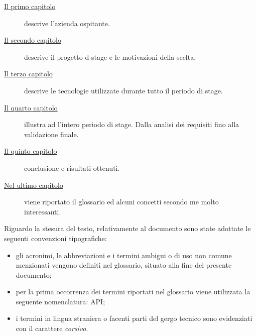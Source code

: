 \begin{description}
	\item[{\hyperref[cap:introduzione]{Il primo capitolo}}] descrive l’azienda ospitante.
	
	\item[{\hyperref[cap:progetto]{Il secondo capitolo}}] descrive il progetto d stage e le motivazioni della scelta.
	
	\item[{\hyperref[cap:Tecnologie utilizzate]{Il terzo capitolo}}] descrive le tecnologie utilizzate durante
	tutto il periodo di stage.

	\item[{\hyperref[cap:progettazione]{Il quarto capitolo}}] illustra ad l'intero periodo di stage. Dalla analisi dei requisiti fino alla validazione finale. 	
	
	\item[{\hyperref[cap:conclusioni]{Il quinto capitolo}}] conclusione e risultati ottenuti.
	
	\item[{\hyperref[cap:conclusioni]{Nel ultimo capitolo}}] viene riportato il glossario ed alcuni concetti secondo me molto interessanti.
\end{description}
Riguardo la stesura del testo, relativamente al documento sono state adottate le seguenti convenzioni tipografiche:
\begin{itemize}
	\item gli acronimi, le abbreviazioni e i termini ambigui o di uso non comune menzionati vengono definiti nel glossario, situato alla fine del presente documento;
	\item per la prima occorrenza dei termini riportati nel glossario viene utilizzata la seguente nomenclatura: \gls{API};
	\item i termini in lingua straniera o facenti parti del gergo tecnico sono evidenziati con il carattere \emph{corsivo}.
\end{itemize}
\endgroup			
\vfill

